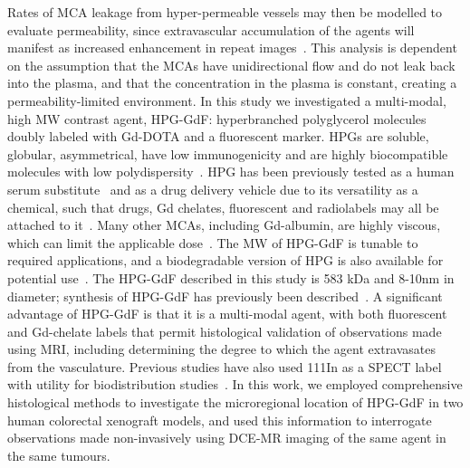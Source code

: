 Rates of \acs{MCA} leakage from hyper-permeable vessels may then be modelled to evaluate permeability, since extravascular accumulation of the agents will manifest as increased enhancement in repeat images~\cite{Ogan:1987tg,Turetschek:2004bw}.
This analysis is dependent on the assumption that the \acs{MCA}s have unidirectional flow and do not leak back into the plasma, and that the concentration in the plasma is constant, creating a permeability-limited environment.
In this study we investigated a multi-modal, high \acs{MW} contrast agent, \acs{HPG-GdF}: hyperbranched polyglycerol molecules doubly labeled with Gd-DOTA and a fluorescent marker.
HPGs are soluble, globular, asymmetrical, have low immunogenicity and are highly biocompatible molecules with low polydispersity~\cite{Saatchi:2012hc,Kainthan:2006ce,Saatchi:2012gc}.
HPG has been previously tested as a human serum substitute~\cite{Kainthan:2008ek} and as a drug delivery vehicle due to its versatility as a chemical, such that drugs, Gd chelates, fluorescent and radiolabels may all be attached to it~\cite{Shenoi:2013id}.
Many other \acs{MCA}s, including Gd-albumin, are highly viscous, which can limit the applicable dose~\cite{Imranulhaq:2012ij}.
The \acs{MW} of \acs{HPG-GdF} is tunable to required applications, and a biodegradable version of HPG is also available for potential use~\cite{Shenoi:2013id}.
The \acs{HPG-GdF} described in this study is 583 \acs{kDa} and 8-10nm in diameter; synthesis of \acs{HPG-GdF} has previously been described~\cite{Saatchi:2012hc}.
A significant advantage of \acs{HPG-GdF} is that it is a multi-modal agent, with both fluorescent and Gd-chelate labels that permit histological validation of observations made using MRI, including determining the degree to which the agent extravasates from the vasculature.
Previous studies have also used 111In as a SPECT label with utility for biodistribution studies~\cite{Saatchi:2012hc}.
In this work, we employed comprehensive histological methods to investigate the microregional location of \acs{HPG-GdF} in two human colorectal xenograft models, and used this information to interrogate observations made non-invasively using DCE-MR imaging of the same agent in the same tumours.

